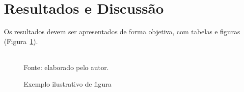 \section{Resultados e Discussão}\label{sec:resultadosDiscussao}

Os resultados devem ser apresentados de forma objetiva, com tabelas e figuras
(Figura~\ref{fig:exemplo}).

\begin{figure}[ht]
\centering
\caption{Exemplo ilustrativo de figura}
\begingroup
\setlength{\fboxsep}{0pt}
\endgroup
\\[2pt]
{\small Fonte: elaborado pelo autor.}
\label{fig:exemplo}
\end{figure}
\vspace{-6pt}

